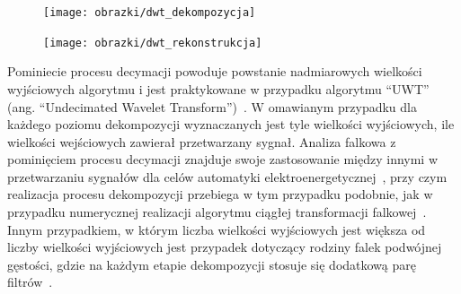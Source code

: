 \begin{figure}[htb!]
\begin{center}
\texttt{[image: obrazki/dwt\_dekompozycja]}
\end{center}
\end{figure}

\begin{figure}[htb!]
\begin{center}
\texttt{[image: obrazki/dwt\_rekonstrukcja]}
\end{center}
\end{figure}

Pominiecie procesu decymacji powoduje powstanie nadmiarowych wielkości wyjściowych algorytmu i jest praktykowane w przypadku algorytmu \enquote{UWT} (ang. \enquote{Undecimated Wavelet Transform})~\cite{lord_guide}. W omawianym przypadku dla każdego poziomu dekompozycji wyznaczanych jest tyle wielkości wyjściowych, ile wielkości wejściowych zawierał przetwarzany sygnał. Analiza falkowa z pominięciem procesu decymacji znajduje swoje zastosowanie między innymi w przetwarzaniu sygnałów dla celów automatyki elektroenergetycznej~\cite{niedopytalski_ene}, przy czym realizacja procesu dekompozycji przebiega w tym przypadku podobnie, jak w przypadku numerycznej realizacji algorytmu ciągłej transformacji falkowej~\cite{lord_guide}. Innym przypadkiem, w którym liczba wielkości wyjściowych jest większa od liczby wielkości wyjściowych jest przypadek dotyczący rodziny falek podwójnej gęstości, gdzie na każdym etapie dekompozycji stosuje się dodatkową parę filtrów~\cite{selenick_ddenusage}.

